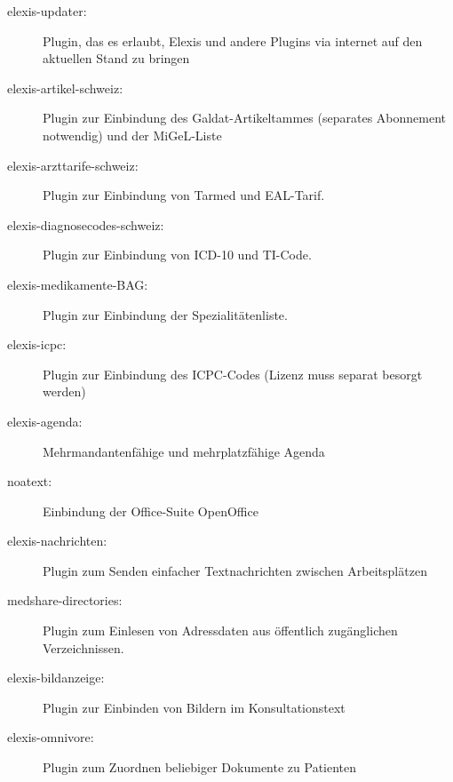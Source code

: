 \begin{description}
  \item[elexis-updater:]  Plugin, das es erlaubt, Elexis und andere Plugins via internet auf den aktuellen Stand zu bringen
  \item [elexis-artikel-schweiz:] Plugin zur Einbindung des Galdat-Artikeltammes (separates Abonnement notwendig) und der MiGeL-Liste
  
  \item[elexis-arzttarife-schweiz:] Plugin zur Einbindung von Tarmed und EAL-Tarif.
  
  \item[elexis-diagnosecodes-schweiz:] Plugin zur Einbindung von ICD-10 und TI-Code.
  
  \item[elexis-medikamente-BAG:] Plugin zur Einbindung der Spezialitätenliste.
  
  \item[elexis-icpc:] Plugin zur Einbindung des ICPC-Codes (Lizenz muss separat besorgt werden)
  
  \item[elexis-agenda:] Mehrmandantenfähige und mehrplatzfähige Agenda
  
  \item[noatext:] Einbindung der Office-Suite OpenOffice
  
  \item[elexis-nachrichten:] Plugin zum Senden einfacher Textnachrichten zwischen Arbeitsplätzen
  \item[medshare-directories:] Plugin zum Einlesen von Adressdaten aus öffentlich zugänglichen Verzeichnissen.
  \item[elexis-bildanzeige:] Plugin zur Einbinden von Bildern im Konsultationstext
  \item[elexis-omnivore:] Plugin zum Zuordnen beliebiger Dokumente zu Patienten
  
  
\end{description}